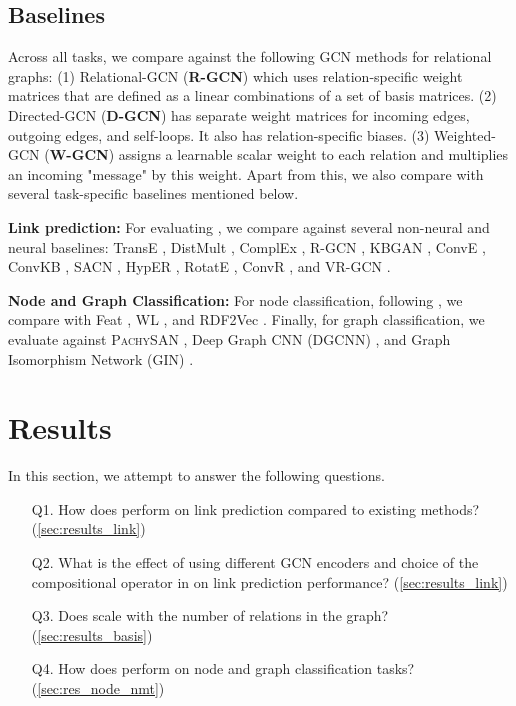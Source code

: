 \documentclass{article} \usepackage{iclr2020_conference,times}
\begin{document}
\subsection{Baselines}
\label{sec:exp_baselines}

Across all tasks, we compare against the following GCN methods for relational graphs: (1) Relational-GCN (\textbf{R-GCN}) \citep{r_gcn} which uses relation-specific weight matrices that are defined as a linear combinations of a set of basis matrices. (2) Directed-GCN (\textbf{D-GCN}) \citep{gcn_srl} has separate weight matrices for incoming edges, outgoing edges, and self-loops. It also has relation-specific biases. (3) Weighted-GCN (\textbf{W-GCN}) \citep{sacn_paper} assigns a learnable scalar weight to each relation and multiplies an incoming "message" by this weight. Apart from this, we also compare with several task-specific baselines mentioned below.

\textbf{Link prediction:} For evaluating \method{}, we compare against several non-neural and neural baselines: TransE \cite{transe}, DistMult \citep{distmult}, ComplEx \citep{complex}, R-GCN \citep{r_gcn}, KBGAN \citep{kbgan}, ConvE \citep{conve}, ConvKB \citep{convkb}, SACN \citep{sacn_paper}, HypER \citep{hyper}, RotatE \citep{rotate}, ConvR \citep{convr}, and VR-GCN \citep{vrgcn}.

\textbf{Node and Graph Classification:} For node classification, following \cite{r_gcn}, we compare with Feat \citep{feat}, WL \citep{wl}, and RDF2Vec \citep{rdf2vec}. Finally, for graph classification, we evaluate against \textsc{PachySAN} \citep{pachysan}, Deep Graph CNN (DGCNN)  \citep{dgcnn}, and Graph Isomorphism Network (GIN) \citep{gin}. 







 \section{Results}
\label{sec:results}






In this section, we attempt to answer the following questions.
\begin{itemize}[itemsep=1pt,topsep=2pt,parsep=0pt,partopsep=0pt]
	\item[Q1.] How does \method{} perform on link prediction compared to existing methods? (\ref{sec:results_link})
	\item[Q2.] What is the effect of using different GCN encoders and choice of the compositional operator in \method{} on link prediction performance? (\ref{sec:results_link})
	\item[Q3.] Does \method{} scale with the number of relations in the graph? (\ref{sec:results_basis})
	\item[Q4.] How does \method{} perform on node and graph classification tasks? (\ref{sec:res_node_nmt})
\end{itemize}
\end{document}
